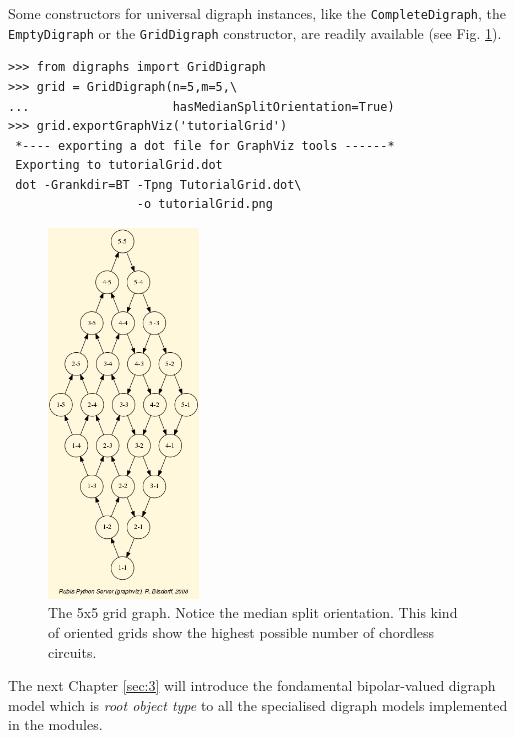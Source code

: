 Some constructors for universal digraph instances, like the \texttt{CompleteDigraph}, the \texttt{EmptyDigraph} or the \texttt{GridDigraph} constructor, are readily available (see Fig. \ref{fig:1.3}).
\begin{lstlisting}
>>> from digraphs import GridDigraph
>>> grid = GridDigraph(n=5,m=5,\
...                    hasMedianSplitOrientation=True)
>>> grid.exportGraphViz('tutorialGrid')
 *---- exporting a dot file for GraphViz tools ------*
 Exporting to tutorialGrid.dot
 dot -Grankdir=BT -Tpng TutorialGrid.dot\
                  -o tutorialGrid.png
\end{lstlisting}
\begin{figure}[h]
\sidecaption[t]
\includegraphics[width=4cm]{Figures/tutorialGrid.png}
\caption{The 5x5 grid graph. Notice the median split orientation. This kind of oriented grids show the highest possible number of chordless circuits. }
\label{fig:1.3}       %
\end{figure}
\clearpage

The next Chapter \ref{sec:3} will introduce the fondamental bipolar-valued digraph model which is \emph{root object type} to all the specialised digraph models implemented in the \Digraph modules.    



